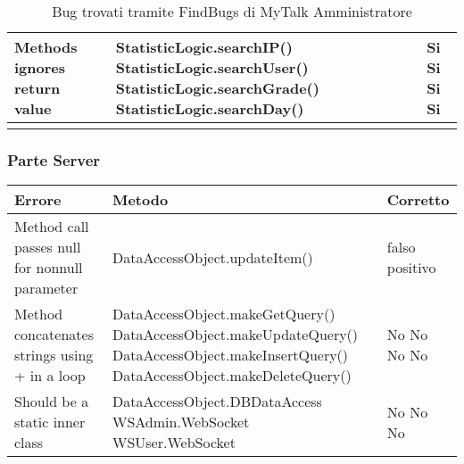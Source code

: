 {{{{\begin{longtable}{p{} p{} p{} }
					Methods ignores return value & StatisticLogic.searchIP()
													\newline StatisticLogic.searchUser()
													\newline StatisticLogic.searchGrade()
													\newline StatisticLogic.searchDay()
													 & Si \newline Si \newline Si \newline Si\\
													 \midrule
													 
													 \caption{Bug trovati tramite FindBugs di MyTalk Amministratore} 
													 \end{longtable}
			
			
	
 
\subsubsection{Parte Server}	
\begin{longtable}{p{} p{} p{} }
\rowcolors{2}{light}{}
\textbf{Errore} & \textbf{Metodo} & \textbf{Corretto} \\
\midrule
	Method call passes null for nonnull parameter & DataAccessObject.updateItem() & falso positivo\\
	\midrule
	Method concatenates strings using + in a loop & DataAccessObject.makeGetQuery() \newline
													  DataAccessObject.makeUpdateQuery() \newline
													  DataAccessObject.makeInsertQuery() \newline
													  DataAccessObject.makeDeleteQuery() \newline
										& No \newline No \newline No \newline No\\
	\midrule
	Should be a static inner class & DataAccessObject.DBDataAccess \newline 
									  WSAdmin.WebSocket \newline 
									  WSUser.WebSocket
									  & No \newline No \newline No\\
									  \midrule
									  

\end{longtable}}}}}
